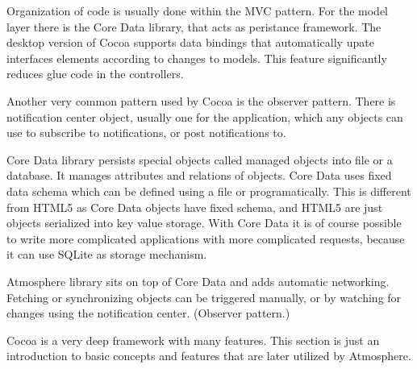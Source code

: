 Organization of code is usually done within the MVC pattern. For the model layer there is the Core Data library, that acts as peristance framework. The desktop version of Cocoa supports data bindings that automatically upate interfaces elements according to changes to models. This feature significantly reduces glue code in the controllers.

Another  very common pattern used by Cocoa is the observer pattern. There is notification center object, usually one for the application, which any objects can use to subscribe to notifications, or post notifications to. 

Core Data library persists special objects called managed objects into file or a database.  It manages attributes and relations of objects. Core Data uses fixed data schema which can be defined using a file or programatically. This is different from HTML5 as Core Data objects have fixed schema, and HTML5 are just objects serialized into key value storage. With Core Data it is of course possible to write more complicated applications with more complicated requests, because it can use SQLite as storage mechanism.

Atmosphere library sits on top of Core Data and adds automatic networking. Fetching or synchronizing objects can be triggered manually, or by watching  for changes using the notification center. (Observer pattern.)

Cocoa is a very deep framework with many features. This section is just an introduction to basic concepts and features that are later utilized by Atmosphere. 
